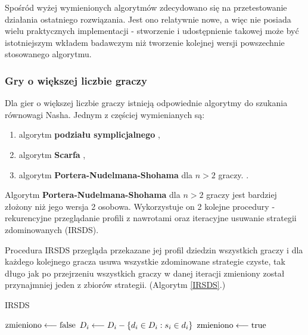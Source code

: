 \documentclass[polish]{standalone}
\begin{document}
Spośród wyżej wymienionych algorytmów zdecydowano się na przetestowanie działania ostatniego rozwiązania. Jest ono
relatywnie nowe, a więc nie posiada wielu praktycznych implementacji - stworzenie i udostępnienie takowej może być
istotniejszym wkładem badawczym niż tworzenie kolejnej wersji powszechnie stosowanego algorytmu.

\subsubsection{Gry o większej liczbie graczy}

Dla gier o większej liczbie graczy istnieją odpowiednie algorytmy do szukania równowagi Nasha. Jednym z częściej
wymienianych są:
\begin{enumerate}
\item algorytm \textbf{podziału symplicjalnego}  \cite{LTH-NE},
\item algorytm \textbf{Scarfa}  \cite{SCARF-NR},
\item algorytm \textbf{Portera-Nudelmana-Shohama} dla $n > 2$ graczy. \cite{PNS-NE}.
\end{enumerate}


Algorytm \textbf{Portera-Nudelmana-Shohama} dla $n > 2$ graczy jest bardziej złożony niż jego wersja 2 osobowa.
Wykorzystuje on 2 kolejne procedury - rekurencyjne przeglądanie profili z nawrotami  oraz
iteracyjne usuwanie strategii zdominowanych  (IRSDS).

Procedura IRSDS przegląda przekazane jej profil dziedzin wszystkich graczy i dla każdego kolejnego gracza usuwa
wszystkie zdominowane strategie czyste, tak długo jak po przejrzeniu wszystkich graczy w danej iteracji zmieniony 
został przynajmniej jeden z zbiorów strategii. (Algorytm \ref*{IRSDS}.)

\begin{algorithm}
\caption{IRSDS}
\label{IRSDS}
\begin{algorithmic}
\REPEAT
 \STATE $\textrm{zmieniono} \longleftarrow \textrm{false}$
     \STATE $D_i \longleftarrow D_i - \{ d_i \in D_i: s_i \in d_i \}$
     \STATE $\textrm{zmieniono} \longleftarrow \textrm{true}$
     \ENDIF
    \ENDIF
   \ENDFOR 
  \ENDFOR
 \ENDFOR
{}
\end{algorithmic}
\end{algorithm}
\end{document}
